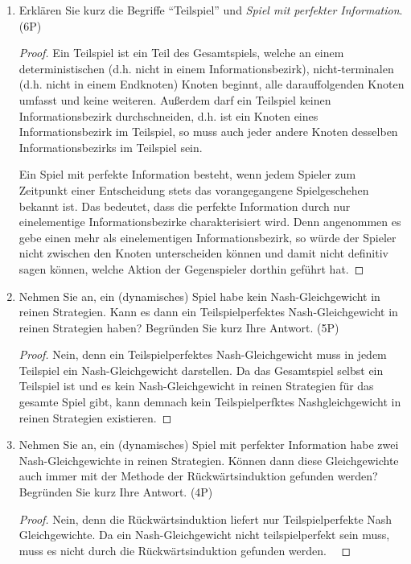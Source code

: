 \documentclass[12pt]{article}
\begin{document}
\begin{enumerate}[label=\alph*\upshape)]
	\item Erklären Sie kurz die Begriffe \enquote{Teilspiel} und \textit{Spiel mit perfekter Information}. (6P)
		\begin{proof}
			Ein Teilspiel ist ein Teil des Gesamtspiels, welche an einem deterministischen (d.h. nicht in einem Informationsbezirk), nicht-terminalen (d.h. nicht in einem Endknoten) Knoten beginnt, alle darauffolgenden Knoten umfasst und keine weiteren. Außerdem darf ein Teilspiel keinen Informationsbezirk durchschneiden, d.h. ist ein Knoten eines Informationsbezirk im Teilspiel, so muss auch jeder andere Knoten desselben Informationsbezirks im Teilspiel sein. ~\smallskip
			
			Ein Spiel mit perfekte Information besteht, wenn jedem Spieler zum Zeitpunkt einer Entscheidung stets das vorangegangene Spielgeschehen bekannt ist. Das bedeutet, dass die perfekte Information durch nur einelementige Informationsbezirke charakterisiert wird. Denn angenommen es gebe einen mehr als einelementigen Informationsbezirk, so würde der Spieler nicht zwischen den Knoten unterscheiden können und damit nicht definitiv sagen können, welche Aktion der Gegenspieler dorthin geführt hat.
		\end{proof}
	\item Nehmen Sie an, ein (dynamisches) Spiel habe kein Nash-Gleichgewicht in reinen Strategien. Kann es dann ein Teilspielperfektes Nash-Gleichgewicht in reinen Strategien haben? Begründen Sie kurz Ihre Antwort. (5P)
		\begin{proof}
			Nein, denn ein Teilspielperfektes Nash-Gleichgewicht muss in jedem Teilspiel ein Nash-Gleichgewicht darstellen. Da das Gesamtspiel selbst ein Teilspiel ist und es kein Nash-Gleichgewicht in reinen Strategien für das gesamte Spiel gibt, kann demnach kein Teilspielperfktes Nashgleichgewicht in reinen Strategien existieren.
		\end{proof}
	\item Nehmen Sie an, ein (dynamisches) Spiel mit perfekter Information habe zwei Nash-Gleichgewichte in reinen Strategien. Können dann diese Gleichgewichte auch immer mit der Methode der Rückwärtsinduktion gefunden werden? Begründen Sie kurz Ihre Antwort. (4P)
		\begin{proof}
			Nein, denn die Rückwärtsinduktion liefert nur Teilspielperfekte Nash Gleichgewichte. Da ein Nash-Gleichgewicht nicht teilspielperfekt sein muss, muss es nicht durch die Rückwärtsinduktion gefunden werden. ~\smallskip
			

\end{proof}
\end{enumerate}
\end{document}
